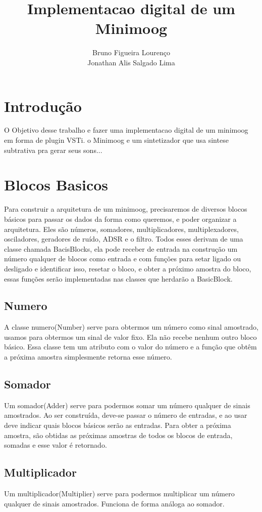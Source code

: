 \documentclass{article}
\title{Implementacao digital de um Minimoog}
\author{Bruno Figueira Lourenço \\ Jonathan Alis Salgado Lima}
\begin{document}
\maketitle

\section{Introdução}
O Objetivo desse trabalho e fazer uma implementacao digital de um minimoog em forma de plugin VSTi.
o Minimoog e um sintetizador que usa sintese subtrativa pra gerar seus sons...


\section{Blocos Basicos}

Para construir a arquitetura de um minimoog, precisaremos de diversos blocos básicos para passar os dados da forma como queremos, e poder organizar a arquitetura.
Eles são números, somadores, multiplicadores, multiplexadores, osciladores, geradores de ruído, ADSR e o filtro.
Todos esses derivam de uma classe chamada BacisBlocks, ela pode receber de entrada na construção um número qualquer de blocos como entrada e com funções para setar ligado ou desligado e identificar isso, resetar o bloco, e obter a próximo amostra do bloco, essas funções serão implementadas nas classes que herdarão a BasicBlock.
\subsection{Numero}
A classe numero(Number) serve para obtermos um número como sinal amostrado, usamos para obtermos um sinal de valor fixo. Ela não recebe nenhum outro bloco básico. Essa classe tem um atributo com o valor do número e a função que obtêm a próxima amostra simplesmente retorna esse número.
\subsection{Somador}
Um somador(Adder) serve para podermos somar um número qualquer de sinais amostrados. Ao ser construída, deve-se passar o número de entradas, e ao usar deve indicar quais blocos básicos serão as entradas. Para obter a próxima amostra, são obtidas as próximas amostras de todos os blocos de entrada, somadas e esse valor é retornado.
\subsection{Multiplicador}
Um multiplicador(Multiplier) serve para podermos multiplicar um número qualquer de sinais amostrados. Funciona de forma análoga ao somador.
\end{document}
